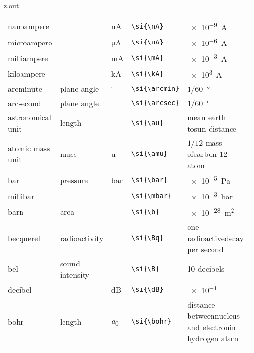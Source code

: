 \begin{VerbatimOut}{z.out}
{\begin{longtable}{@{}P{1.4in}P{1in}llP{1.8in}@{}}
    \quad nanoampere&
      \ditto&
      \si{\nA}&
      \verb+\si{\nA}+&
      \SI{e-9}{\A}\\
    \quad microampere&
      \ditto&
      \si{\uA}&
      \verb+\si{\uA}+&
      \SI{e-6}{\A}\\
    \quad milliampere&
      \ditto&
      \si{\mA}&
      \verb+\si{\mA}+&
      \SI{e-3}{\A}\\
    \quad kiloampere&
      \ditto&
      \si{\kA}&
      \verb+\si{\kA}+&
      \SI{e3}{\A}\\
    \vsp
    \vsp
    arcminute&
      plane angle&
      \si{\arcmin}&
      \verb+\si{\arcmin}+&
      \SI{1/60}{\degree}\\
    arcsecond&
      plane angle&
      \si{\arcsec}&
      \verb+\si{\arcsec}+&
      \SI{1/60}{\arcmin}\\
    \vsp
    astronomical unit&
      length&
      \si{\au}&
      \verb+\si{\au}+&
      mean earth to\newline sun distance\\
    \vsp
    atomic mass unit&
      mass&
      \si{\amu}&
      \verb+\si{\amu}+&
      \(1/12\) mass of\newline carbon-12 atom\\
    \vsp
    bar&
      pressure&
      \si{\bar}&
      \verb+\si{\bar}+&
      \SI{e-5}{\Pa}\\
    \quad millibar&
      \ditto&
      \si{\mbar}&
      \verb+\si{\mbar}+&
      \SI{e-3}{\bar}\\
    \vsp
    barn&
      area&
      \si{\b}&
      \verb+\si{\b}+&
      \SI{e-28}{\m\squared}\\
    \vsp
    becquerel&
      radioactivity&
      \si{\Bq}&
      \verb+\si{\Bq}+&
      one radioactive\newline decay per second\\
    \vsp
    bel&
      sound intensity&
      \si{\B}&
      \verb+\si{\B}+&
      10 decibels\\
    \quad decibel&
      \ditto&
      \si{\dB}&
      \verb+\si{\dB}+&
      \SI{e-1}{\B}\\
    \vsp
    bohr&
      length&
      \si{\bohr}&
      \verb+\si{\bohr}+&
      distance between\newline nucleus and electron\newline in hydrogen atom\\
    \vsp

\end{longtable}}
\end{VerbatimOut}
